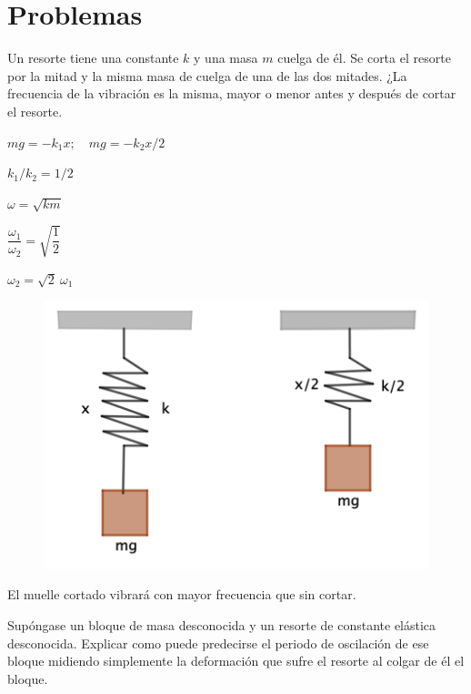 \section{Problemas}
\vspace{10mm} %
\begin{prob}
Un resorte tiene una constante $k$ y una masa $m$ cuelga de él. Se corta el resorte por la mitad y la misma masa de cuelga de una de las dos mitades. ¿La frecuencia de la vibración es la misma, mayor o menor antes y después de cortar el resorte.	
\end{prob}

\begin{multicols}{2}
$mg=-k_1x;\quad mg=-k_2x/2$

$k_1/k_2=1/2$

$\omega=\sqrt{k m}$

$\dfrac {\omega_1}{\omega_2}=\sqrt{\dfrac 1 2}$

$\omega_2=\sqrt{2}\ \omega_1$
\begin{figure}[H]
		\centering
		\includegraphics[width=.5\textwidth]{imagenes/imagenes21/T21IM07.png}
	\end{figure}	
\end{multicols}

El muelle cortado vibrará con mayor frecuencia que sin cortar.
\vspace{5mm} %
\begin{prob}
Supóngase un bloque de masa desconocida y un resorte de constante elástica desconocida. Explicar como puede predecirse el periodo	de oscilación de ese bloque midiendo simplemente la deformación que sufre el resorte al colgar de él el bloque.
\end{prob}

